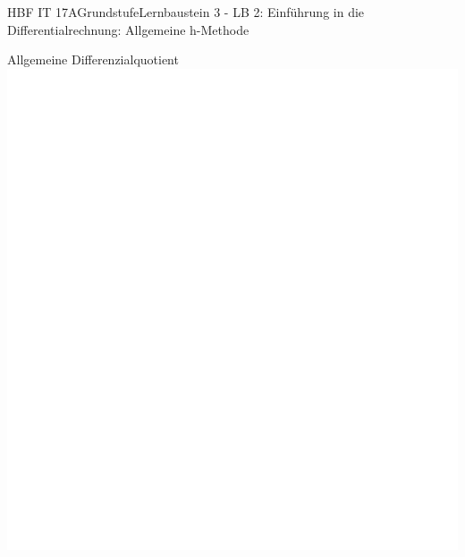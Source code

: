 \documentclass[oneside,openany,headings=optiontotoc,11pt,numbers=noenddot]{scrreprt}
\begin{document}
\begin{worksheet}{HBF IT 17A}{Grundstufe}{Lernbaustein 3 - LB 2: Einführung in die Differentialrechnung: Allgemeine h-Methode}
		\begin{framed}
			\noindent
			\tiny{\color{codegray}Allgemeine Differenzialquotient}\\
			\includegraphics[scale=0.39]{../empty.jpg}
		\end{framed}
	\end{worksheet}
\end{document}
